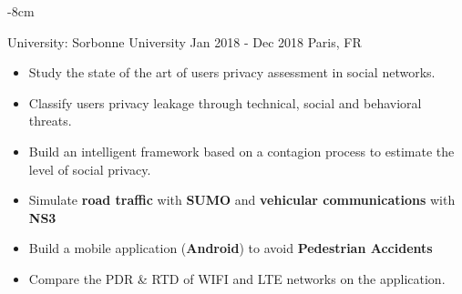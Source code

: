 
\begin{adjustwidth}{}{-8cm}
\makecvheader
\end{adjustwidth}


 {University: Sorbonne University} {Jan 2018 - Dec 2018} {Paris, FR}
\begin{itemize}
	\item Study the state of the art of users privacy assessment in social networks.
	\item Classify users privacy leakage through technical, social and behavioral threats.
	\item Build an intelligent framework based on a contagion process to estimate the level of social privacy.
\end{itemize}

\divider

\begin{itemize}
	\item Simulate \textbf {road traffic} with \textbf {SUMO} and \textbf {vehicular communications} with \textbf {NS3}
	\item Build a mobile application (\textbf {Android}) to avoid \textbf {Pedestrian Accidents}
	\item Compare the PDR \& RTD of WIFI and LTE networks on the application.
\end{itemize}

